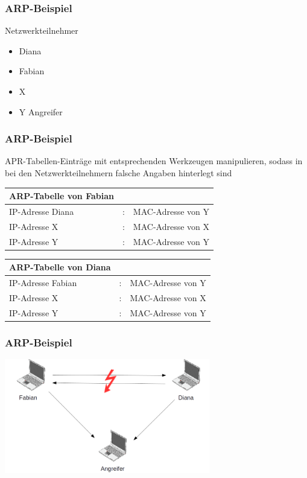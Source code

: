\documentclass{beamer}
\begin{document}
    	\begin{frame}
	   		\frametitle{ARP-Beispiel}
	   		Netzwerkteilnehmer
	   		\begin{itemize}
	   		\item Diana
	   		\item Fabian
	   		\item X
	   		\item Y Angreifer
	   		\end{itemize}           	
	   	\end{frame}
	   	
	   	\begin{frame}
	   		\frametitle{ARP-Beispiel}
	   		APR-Tabellen-Einträge mit entsprechenden Werkzeugen manipulieren, sodass in bei den Netzwerkteilnehmern falsche Angaben hinterlegt sind
	   			\vfill
			   	\begin{tabular}{l c l}
			   		ARP-Tabelle von Fabian & & \\
			   		\hline
			   		IP-Adresse Diana & : & MAC-Adresse von Y \\
			   		IP-Adresse X & : & MAC-Adresse von X \\
			   		IP-Adresse Y & : & MAC-Adresse von Y \\
			   	\end{tabular}
			   	\vfill
			   	\begin{tabular}{l c l}
			   		ARP-Tabelle von Diana & & \\
			   		\hline
			   		IP-Adresse Fabian & : & MAC-Adresse von Y \\
			   		IP-Adresse X & : & MAC-Adresse von X \\
			   		IP-Adresse Y & : & MAC-Adresse von Y \\
			   	\end{tabular}         	
	   	\end{frame}
	   	
	   	\begin{frame}
	   		\frametitle{ARP-Beispiel}
	   		\includegraphics[height=5.0cm]{ARP-Tabelle-manipuliert.png}
	   	\end{frame}
	   	
\end{document}
